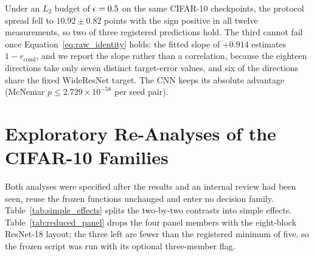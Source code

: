 Under an $L_2$ budget of $\epsilon = 0.5$ on the same CIFAR-10 checkpoints, the protocol spread fell to $10.92\pm0.82$ points with the sign positive in all twelve measurements, so two of three registered predictions hold. The third cannot fail once Equation~\eqref{eq:raw_identity} holds: the fitted slope of $+0.914$ estimates $1 - r_{\text{cond}}$, and we report the slope rather than a correlation, because the eighteen directions take only seven distinct target-error values, and six of the directions share the fixed WideResNet target. The CNN keeps its absolute advantage (McNemar $p \leq 2.729\times10^{-58}$ per seed pair).

\section{Exploratory Re-Analyses of the CIFAR-10 Families}
\label{app:exploratory}

Both analyses were specified after the results and an internal review had been seen, reuse the frozen functions unchanged and enter no decision family. Table~\ref{tab:simple_effects} splits the two-by-two contrasts into simple effects. Table~\ref{tab:reduced_panel} drops the four panel members with the eight-block ResNet-18 layout; the three left are fewer than the registered minimum of five, so the frozen script was run with its optional three-member flag.

